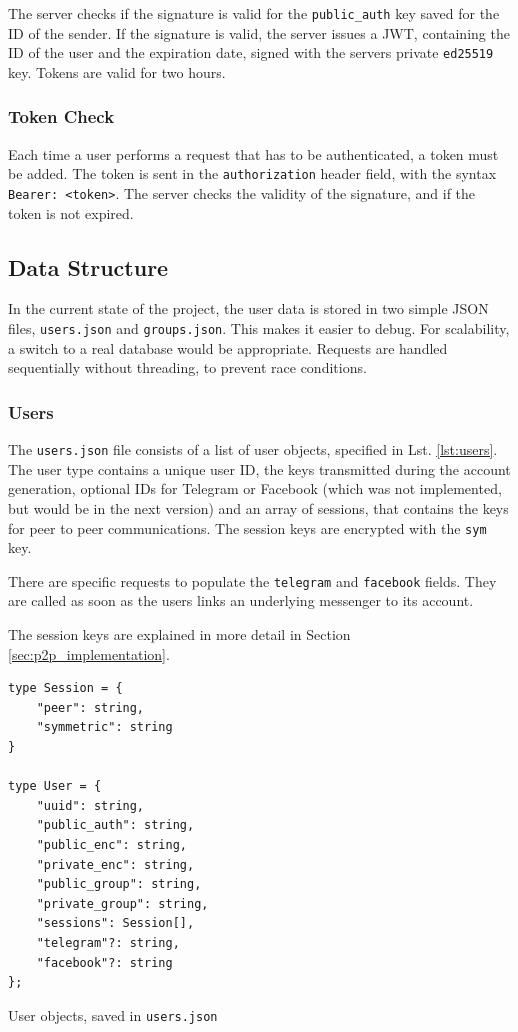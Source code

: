\documentclass[a4paper, oneside]{discothesis}
\begin{document}
The server checks if the signature is valid for the \texttt{public\_auth} key saved for the ID of the sender. If the signature is valid, the server issues a JWT, containing the ID of the user and the expiration date, signed with the servers private \texttt{ed25519} key. Tokens are valid for two hours.

\subsubsection{Token Check}

Each time a user performs a request that has to be authenticated, a token must be added. The token is sent in the \texttt{authorization} header field, with the syntax \texttt{Bearer: <token>}. The server checks the validity of the signature, and if the token is not expired.

\subsection{Data Structure}

In the current state of the project, the user data is stored in two simple JSON files, \texttt{users.json} and \texttt{groups.json}. This makes it easier to debug. For scalability, a switch to a real database would be appropriate. Requests are handled sequentially without threading, to prevent race conditions.

\subsubsection{Users}

The \texttt{users.json} file consists of a list of user objects, specified in Lst. \ref{lst:users}. The user type contains a unique user ID, the keys transmitted during the account generation, optional IDs for Telegram or Facebook (which was not implemented, but would be in the next version) and an array of sessions, that contains the keys for peer to peer communications. The session keys are encrypted with the \texttt{sym} key.

There are specific requests to populate the \texttt{telegram} and \texttt{facebook} fields. They are called as soon as the users links an underlying messenger to its account.

The session keys are explained in more detail in Section \ref{sec:p2p_implementation}.


\begin{listing}[h!]
\begin{verbatim}
type Session = {
    "peer": string,
    "symmetric": string
}

type User = {
    "uuid": string,
    "public_auth": string,
    "public_enc": string,
    "private_enc": string,
    "public_group": string,
    "private_group": string,
    "sessions": Session[],
    "telegram"?: string,
    "facebook"?: string
};
\end{verbatim}
\caption{User objects, saved in \texttt{users.json}}
\label{lst:users}
\end{listing}
\end{document}
